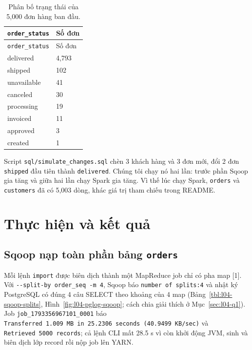 \documentclass[
  12pt,
  a4paper,
]{article}
\begin{document}
\begin{longtable}[]{@{}ll@{}}
\caption{\label{tbl:l04-status}Phân bố trạng thái của 5,000 đơn hàng ban
đầu.}\tabularnewline
\toprule\noalign{}
\texttt{order\_status} & Số đơn \\
\midrule\noalign{}
\endfirsthead
\toprule\noalign{}
\texttt{order\_status} & Số đơn \\
\midrule\noalign{}
\endhead
\bottomrule\noalign{}
\endlastfoot
delivered & 4,793 \\
shipped & 102 \\
unavailable & 41 \\
canceled & 30 \\
processing & 19 \\
invoiced & 11 \\
approved & 3 \\
created & 1 \\
\end{longtable}

Script
\texttt{sql/}\allowbreak{}\texttt{simulate\_}\allowbreak{}\texttt{changes.}\allowbreak{}\texttt{sql}\allowbreak{}
chèn 3 khách hàng và 3 đơn mới, đổi 2 đơn \texttt{shipped} đầu tiên
thành \texttt{delivered}. Chúng tôi chạy nó hai lần: trước phần Sqoop
gia tăng và giữa hai lần chạy Spark gia tăng. Vì thế lúc chạy Spark,
\texttt{orders} và \texttt{customers} đã có 5,003 dòng, khác giá trị
tham chiếu trong README.

\section{Thực hiện và kết quả}\label{sec:l04-results}

\subsection{\texorpdfstring{Sqoop nạp toàn phần bảng
\texttt{orders}}{Sqoop nạp toàn phần bảng orders}}\label{sec:l04-sqoop-full}

Mỗi lệnh \texttt{import} được biên dịch thành một MapReduce job chỉ có
pha map {[}1{]}. Với
\texttt{-\/-split-by\ order\_}\allowbreak{}\texttt{seq\ -m\ 4}\allowbreak{},
Sqoop báo
\texttt{number\ of\ splits:}\allowbreak{}\texttt{4}\allowbreak{} và nhật
ký PostgreSQL có đúng 4 câu SELECT theo khoảng của 4 map
(Bảng~\ref{tbl:l04-sqoop-splits}, Hình~\ref{fig:l04-pglog-sqoop}; cách
chia giải thích ở Mục~\ref{sec:l04-q1}). Job
\texttt{job\_}\allowbreak{}\texttt{1793356967101\_}\allowbreak{}\texttt{0001}\allowbreak{}
báo
\texttt{Transferred\ 1.}\allowbreak{}\texttt{009\ MB\ in\ 25.}\allowbreak{}\texttt{2306\ seconds\ (40.}\allowbreak{}\texttt{9499\ KB/}\allowbreak{}\texttt{sec)}\allowbreak{}
và \texttt{Retrieved\ 5000\ records}\allowbreak{}; cả lệnh CLI mất 28.5
s vì còn khởi động JVM, sinh và biên dịch lớp record rồi nộp job lên
YARN.
\end{document}
